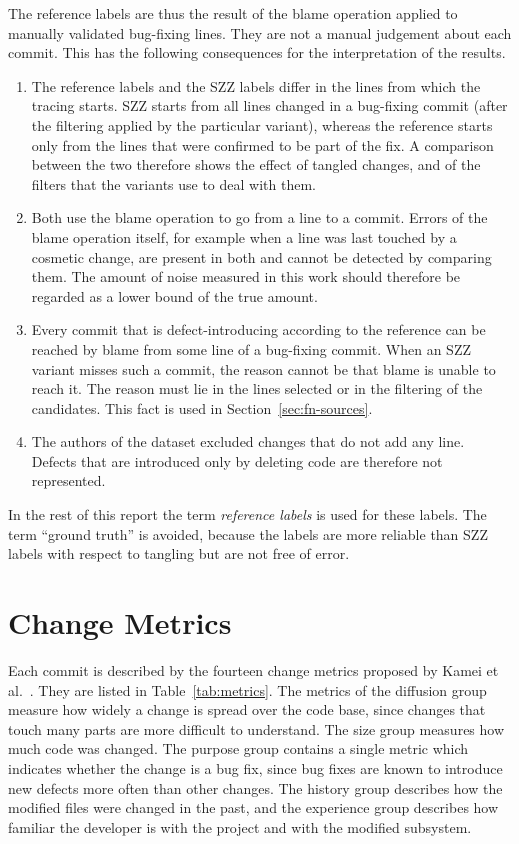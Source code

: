 \documentclass[12pt,a4paper,oneside]{report}
\begin{document}
The reference labels are thus the result of the blame operation applied to
manually validated bug-fixing lines. They are not a manual judgement about
each commit. This has the following consequences for the interpretation of
the results.

\begin{enumerate}[leftmargin=*]
\item The reference labels and the SZZ labels differ in the lines from which
the tracing starts. SZZ starts from all lines changed in a bug-fixing commit
(after the filtering applied by the particular variant), whereas the reference
starts only from the lines that were confirmed to be part of the fix. A
comparison between the two therefore shows the effect of tangled changes, and
of the filters that the variants use to deal with them.
\item Both use the blame operation to go from a line to a commit. Errors of
the blame operation itself, for example when a line was last touched by a
cosmetic change, are present in both and cannot be detected by comparing
them. The amount of noise measured in this work should therefore be regarded
as a lower bound of the true amount.
\item Every commit that is defect-introducing according to the reference can
be reached by blame from some line of a bug-fixing commit. When an SZZ
variant misses such a commit, the reason cannot be that blame is unable to
reach it. The reason must lie in the lines selected or in the filtering of the
candidates. This fact is used in Section~\ref{sec:fn-sources}.
\item The authors of the dataset excluded changes that do not add any line.
Defects that are introduced only by deleting code are therefore not
represented.
\end{enumerate}

In the rest of this report the term \emph{reference labels} is used for these
labels. The term ``ground truth'' is avoided, because the labels are more
reliable than SZZ labels with respect to tangling but are not free of error.

\section{Change Metrics}\label{sec:features}

Each commit is described by the fourteen change metrics proposed by Kamei et
al.~\cite{kamei2013jit}. They are listed in Table~\ref{tab:metrics}. The
metrics of the diffusion group measure how widely a change is spread over the
code base, since changes that touch many parts are more difficult to
understand. The size group measures how much code was changed. The purpose
group contains a single metric which indicates whether the change is a bug
fix, since bug fixes are known to introduce new defects more often than other
changes. The history group describes how the modified files were changed in
the past, and the experience group describes how familiar the developer is
with the project and with the modified subsystem.
\end{document}
